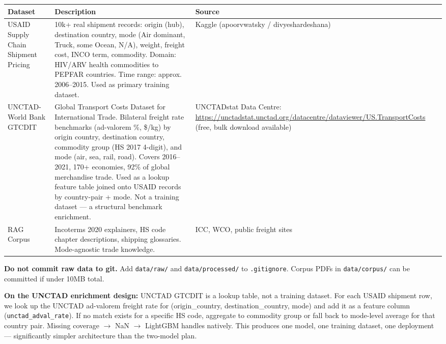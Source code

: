 \documentclass[11pt, a4paper]{article}
\begin{document}
\begin{tabularx}{\textwidth}{lXl}
\toprule
\textbf{Dataset} & \textbf{Description} & \textbf{Source} \\
\midrule
USAID Supply Chain Shipment Pricing & 10k+ real shipment records: origin (hub), destination country, mode (Air dominant, Truck, some Ocean, N/A), weight, freight cost, INCO term, commodity. Domain: HIV/ARV health commodities to PEPFAR countries. Time range: approx. 2006--2015. Used as primary training dataset. & Kaggle (apoorvwatsky / divyeshardeshana) \\
\addlinespace
UNCTAD-World Bank GTCDIT & Global Transport Costs Dataset for International Trade. Bilateral freight rate benchmarks (ad-valorem \%, \$/kg) by origin country, destination country, commodity group (HS 2017 4-digit), and mode (air, sea, rail, road). Covers 2016--2021, 170+ economies, 92\% of global merchandise trade. Used as a lookup feature table joined onto USAID records by country-pair + mode. Not a training dataset --- a structural benchmark enrichment. & UNCTADstat Data Centre: \url{https://unctadstat.unctad.org/datacentre/dataviewer/US.TransportCosts} (free, bulk download available) \\
\addlinespace
RAG Corpus & Incoterms 2020 explainers, HS code chapter descriptions, shipping glossaries. Mode-agnostic trade knowledge. & ICC, WCO, public freight sites \\
\bottomrule
\end{tabularx}

\begin{warnbox}
\textbf{Do not commit raw data to git.} Add \texttt{data/raw/} and \texttt{data/processed/} to \texttt{.gitignore}. Corpus PDFs in \texttt{data/corpus/} can be committed if under 10MB total.
\end{warnbox}

\begin{infobox}
\textbf{On the UNCTAD enrichment design:} UNCTAD GTCDIT is a lookup table, not a training dataset. For each USAID shipment row, we look up the UNCTAD ad-valorem freight rate for (origin\_country, destination\_country, mode) and add it as a feature column (\texttt{unctad\_adval\_rate}). If no match exists for a specific HS code, aggregate to commodity group or fall back to mode-level average for that country pair. Missing coverage $\rightarrow$ NaN $\rightarrow$ LightGBM handles natively. This produces one model, one training dataset, one deployment --- significantly simpler architecture than the two-model plan.
\end{infobox}
\end{document}
